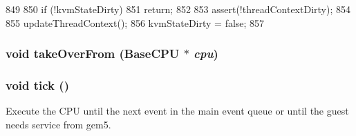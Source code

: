 \begin{DoxyCode}
849 {
850     if (!kvmStateDirty)
851         return;
852 
853     assert(!threadContextDirty);
854 
855     updateThreadContext();
856     kvmStateDirty = false;
857 }
\end{DoxyCode}
\hypertarget{classBaseKvmCPU_a6ab19fbe58a682743f9e652e9777fdac}{
\subsubsection[{takeOverFrom}]{\setlength{\rightskip}{0pt plus 5cm}void takeOverFrom ({\bf BaseCPU} $\ast$ {\em cpu})}}
\label{classBaseKvmCPU_a6ab19fbe58a682743f9e652e9777fdac}
\hypertarget{classBaseKvmCPU_a873dd91783f9efb4a590aded1f70d6b0}{
\subsubsection[{tick}]{\setlength{\rightskip}{0pt plus 5cm}void tick ()}}
\label{classBaseKvmCPU_a873dd91783f9efb4a590aded1f70d6b0}
Execute the CPU until the next event in the main event queue or until the guest needs service from gem5. 



